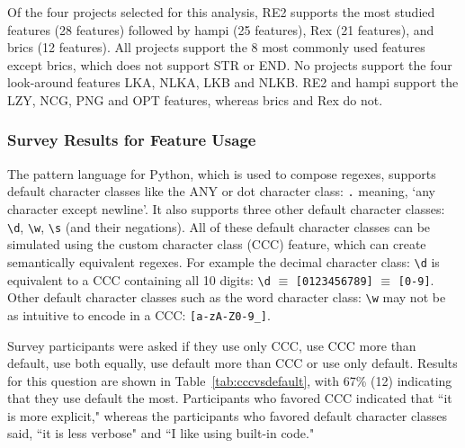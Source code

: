 

Of the four projects selected for this analysis, RE2 supports the most studied features (28 features) followed by hampi (25 features),  Rex (21 features), and brics (12 features).  All projects support the 8 most commonly used features except brics, which does not support STR or END.
No projects support the four look-around features LKA, NLKA, LKB and NLKB.  RE2 and hampi support the LZY, NCG, PNG and OPT features, whereas brics and Rex do not.%


\subsubsection{Survey Results for Feature Usage}
The pattern language for Python, which is used to compose regexes, supports default character classes like the ANY or dot character class: \verb!.! meaning, `any character except newline'. %
It also supports three other default character classes: \verb!\d!, \verb!\w!, \verb!\s! (and their negations). All of these default character classes can be simulated using the custom character class (CCC) feature, which can create semantically equivalent regexes.
For example  the decimal character class: \verb!\d! is equivalent to a CCC containing all 10 digits:  \verb!\d! $\equiv$ \verb![0123456789]! $\equiv$ \verb![0-9]!.
Other default character classes such as the word character class: \verb!\w! may not be as intuitive to encode in a CCC: \verb![a-zA-Z0-9_]!.

Survey participants were asked if they use only CCC, use CCC more than default, use both equally, use default more than CCC or use only default.  Results for this question are shown in Table~\ref{tab:cccvsdefault}, with 67\% (12) indicating that they use default the most.
 Participants who favored CCC indicated that ``it is more explicit," whereas the participants who favored default character classes said,  ``it is less verbose" and ``I like using built-in code." 




